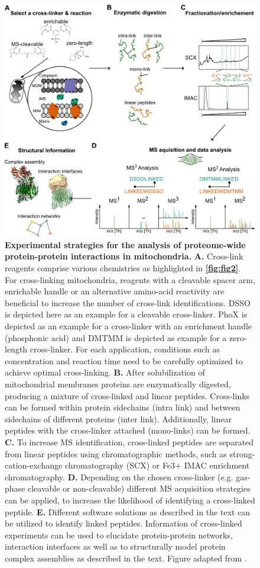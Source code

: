 \begin{figure}[p]
    \center
    \includegraphics[width=0.95 \textwidth]{Chapter.1/Figures/Figure3.png}
    \caption{\textbf{Experimental strategies for the analysis of proteome-wide protein-protein interactions in mitochondria.} \textbf{A.} Cross-link reagents comprise various chemistries as highlighted in \textbf{\autoref{fig:fig2}}. For cross-linking mitochondria, reagents with a cleavable spacer arm, enrichable handle or an alternative amino-acid reactivity are beneficial to increase the number of cross-link identifications. DSSO is depicted here as an example for a cleavable cross-linker. PhoX is depicted as an example for a cross-linker with an enrichment handle (phosphonic acid) and DMTMM is depicted as example for a zero-length cross-linker. For each application, conditions such as concentration and reaction time need to be carefully optimized to achieve optimal cross-linking. \textbf{B.} After solubilization of mitochondrial membranes proteins are enzymatically digested, producing a mixture of cross-linked and linear peptides. Cross-links can be formed within protein sidechains (intra link) and between sidechains of different proteins (inter link). Additionally, linear peptides with the cross-linker attached (mono-links) can be formed. \textbf{C.} To increase MS identification, cross-linked peptides are separated from linear peptides using chromatographic methods, such as strong-cation-exchange chromatography (SCX) or Fe3+ IMAC enrichment chromatography. \textbf{D.} Depending on the chosen cross-linker (e.g. gas-phase cleavable or non-cleavable) different MS acquisition strategies can be applied, to increase the likelihood of identifying a cross-linked peptide. \textbf{E.} Different software solutions as described in the text can be utilized to identify linked peptides. Information of cross-linked experiments can be used to elucidate protein-protein networks, interaction interfaces as well as to structurally model protein complex assemblies as described in the text. Figure adapted from \cite{Hevler_2021b}.}
    \label{fig:fig3}
\end{figure}
